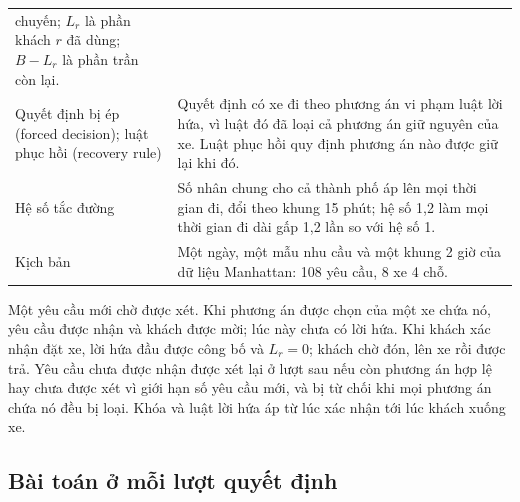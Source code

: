 \begin{table}[htbp]
\begin{tabular}{@{}p{4.3cm}p{10.5cm}@{}}
chuyến; $L_r$ là phần khách $r$ đã dùng; $B - L_r$ là phần trần còn lại.\\
Quyết định bị ép (forced decision); luật phục hồi (recovery rule) & Quyết định có xe đi theo phương án vi
phạm luật lời hứa, vì luật đó đã loại cả phương án giữ nguyên của xe. Luật phục hồi quy định phương án nào
được giữ lại khi đó.\\
Hệ số tắc đường & Số nhân chung cho cả thành phố áp lên mọi thời gian đi, đổi theo khung 15 phút; hệ số 1,2
làm mọi thời gian đi dài gấp 1,2 lần so với hệ số 1.\\
Kịch bản & Một ngày, một mẫu nhu cầu và một khung 2 giờ của dữ liệu Manhattan: 108 yêu cầu, 8 xe 4 chỗ.\\
\bottomrule
\end{tabular}
\end{table}

Một yêu cầu mới chờ được xét. Khi phương án được chọn của một xe chứa nó, yêu cầu được nhận và khách được
mời; lúc này chưa có lời hứa. Khi khách xác nhận đặt xe, lời hứa đầu được công bố và $L_r = 0$; khách chờ
đón, lên xe rồi được trả. Yêu cầu chưa được nhận được xét lại ở lượt sau nếu còn phương án hợp lệ hay chưa
được xét vì giới hạn số yêu cầu mới, và bị từ chối khi mọi phương án chứa nó đều bị loại. Khóa và luật lời
hứa áp từ lúc xác nhận tới lúc khách xuống xe.

\subsection{Bài toán ở mỗi lượt quyết định}
\label{muc:baitoan-phatbieu}

